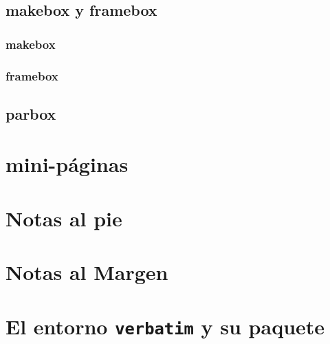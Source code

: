 \documentclass[12pt,aspectratio=43]{beamer}
\begin{document}
\subsection{makebox y framebox}

\subsubsection{makebox}

\subsubsection{framebox}

\subsection{parbox}

\section{mini-páginas}

\section{Notas al pie}

\section{Notas al Margen}

\section{El entorno {\tt verbatim} y su paquete}
\end{document}
